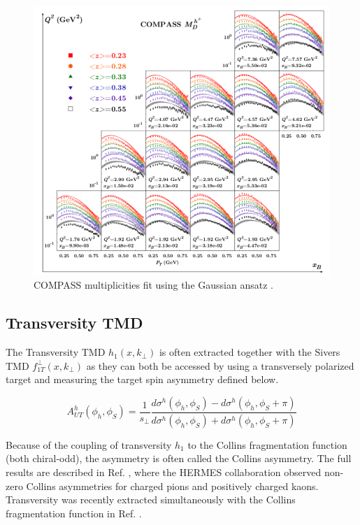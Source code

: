 \begin{figure}
	\centering
	\includegraphics[width=\textwidth]{image/plots/introduction/compass_multi_fit.png}
	\caption{COMPASS multiplicities fit using the Gaussian ansatz \cite{tmds-anselmino:2013}.}
	\label{fig:commult}
\end{figure}

\subsection{Transversity TMD}
The Transversity TMD $h_1 (x, k_{\perp})$ is often extracted together with the Sivers TMD $f_{1T}^{\perp} (x, k_{\perp})$ as they can both be accessed by using a transversely polarized target and measuring the target spin asymmetry defined below.

\begin{equation}
	A_{UT}^{h} (\phi_h, \phi_S) = \frac{1}{s_{\perp}} \frac{d\sigma^h (\phi_h, \phi_S) - d\sigma^h (\phi_h, \phi_S + \pi)}{d\sigma^h (\phi_h, \phi_S) + d\sigma^h (\phi_h, \phi_S + \pi)}
\end{equation}

Because of the coupling of transversity $h_1$ to the Collins fragmentation function (both chiral-odd), the asymmetry is often called the Collins asymmetry.  The full results are described in Ref. \cite{tmds-airapetian:2010}, where the HERMES collaboration observed non-zero Collins asymmetries for charged pions and positively charged kaons.  Transversity was recently extracted simultaneously with the Collins fragmentation function in Ref. \cite{tmds-lin:2017}.  

